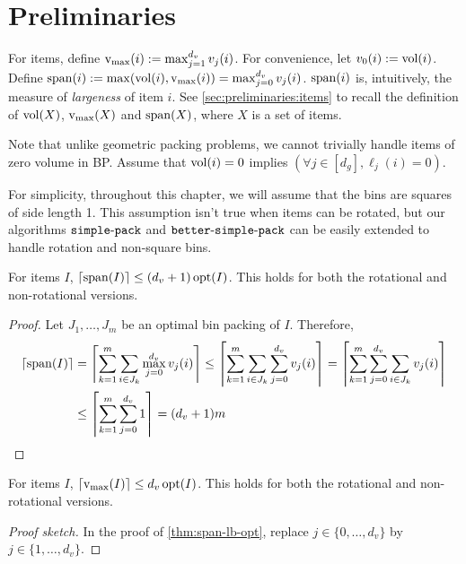 \section{Preliminaries}
\label{sec:gvbp-prelims}

For  items,
define $\operatorname{v_{\max}}(i) := \max_{j=1}^{d_v} v_j(i)$.
For convenience, let $v_0(i) := \operatorname{vol}(i)$.
Define $\operatorname{span}(i) := \max(\operatorname{vol}(i), \operatorname{v_{\max}}(i)) = \max_{j=0}^{d_v} v_j(i)$.
$\operatorname{span}(i)$ is, intuitively, the measure of \emph{largeness} of item $i$.
See \cref{sec:preliminaries:items} to recall the definition of
$\operatorname{vol}(X)$, $\operatorname{v_{\max}}(X)$ and $\operatorname{span}(X)$,
where $X$ is a set of  items.

Note that unlike geometric packing problems,
we cannot trivially handle items of zero volume in  BP.
Assume \wLoG{} that $\operatorname{vol}(i) = 0$ implies $(\forall j \in [d_g], \ell_j(i) = 0)$.

For simplicity, throughout this chapter, we will assume that the bins are squares of side length 1.
This assumption isn't true when items can be rotated, but our algorithms
$\operatorname{\mathtt{simple-pack}}$ and $\operatorname{\mathtt{better-simple-pack}}$ can be easily extended to handle
rotation and non-square bins.

\begin{lemma}
\label{thm:span-lb-opt}
For  items $I$, $\left\lceil \operatorname{span}(I) \right\rceil \le (d_v+1)\operatorname{opt}(I)$.
This holds for both the rotational and non-rotational versions.
\end{lemma}
\begin{proof}
Let $J_1, \ldots, J_m$ be an optimal bin packing of $I$. Therefore,
\begin{align*}
\left\lceil \operatorname{span}(I) \right\rceil &= \left\lceil \sum_{k=1}^m \sum_{i \in J_k} \max_{j=0}^{d_v} v_j(i) \right\rceil
\le \left\lceil \sum_{k=1}^m \sum_{i \in J_k} \sum_{j=0}^{d_v} v_j(i) \right\rceil
= \left\lceil \sum_{k=1}^m \sum_{j=0}^{d_v} \sum_{i \in J_k} v_j(i) \right\rceil
\\ &\le \left\lceil \sum_{k=1}^m \sum_{j=0}^{d_v} 1 \right\rceil
= (d_v+1)m  \qedhere
\end{align*}
\end{proof}

\begin{lemma}
\label{thm:vmax-lb-opt}
For  items $I$, $\left\lceil \operatorname{v_{\max}}(I) \right\rceil \le d_v\operatorname{opt}(I)$.
This holds for both the rotational and non-rotational versions.
\end{lemma}
\begin{proof}[Proof sketch]
In the proof of \cref{thm:span-lb-opt}, replace $j \in \{0, \ldots, d_v\}$
by $j \in \{1, \ldots, d_v\}$.
\end{proof}

